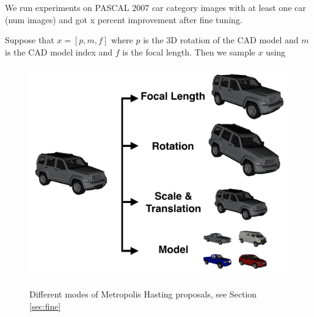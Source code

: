 \documentclass[10pt,twocolumn,letterpaper]{article}
\begin{document}
We run experiments on PASCAL 2007 car category images with at least one car
(num images) and got x percent improvement after fine tuning.


Suppose that $x = [p, m, f]$ where $p$ is the 3D rotation of the CAD model and
$m$ is the CAD model index and $f$ is the focal length. Then we sample $x$ using 
\begin{figure}[t]
\centering
    \includegraphics[width=0.7\linewidth]{tuning2} \\ [-5pt]
    \caption{Different modes of Metropolis Hasting proposals, see Section \ref{sec:fine}}
 \label{fig:tuningmode}
\end{figure}
    
\end{document}
